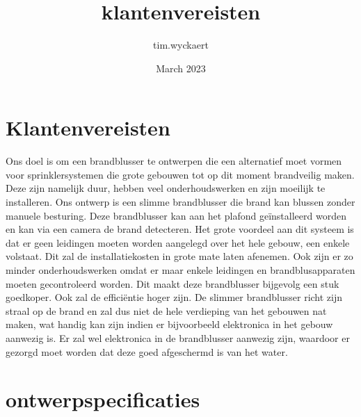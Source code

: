 \documentclass{article}
\title{klantenvereisten}
\author{tim.wyckaert }
\date{March 2023}
\begin{document}
\maketitle

\section{Klantenvereisten}

Ons doel is om een brandblusser te ontwerpen die een alternatief moet vormen voor sprinklersystemen die grote gebouwen tot op dit moment brandveilig maken. Deze zijn namelijk duur, hebben veel onderhoudswerken en zijn moeilijk te installeren. Ons ontwerp is een slimme brandblusser die brand kan blussen zonder manuele besturing. Deze brandblusser kan aan het plafond geïnstalleerd worden en kan via een camera  de brand  detecteren. Het grote voordeel aan dit systeem  is dat er geen leidingen moeten worden aangelegd over het hele gebouw, een enkele volstaat. Dit zal de installatiekosten in grote mate laten afenemen. Ook zijn er zo minder onderhoudswerken omdat er maar  enkele leidingen en brandblusapparaten moeten gecontroleerd worden. Dit maakt deze brandblusser bijgevolg een stuk goedkoper. Ook zal de efficiëntie hoger zijn. De slimmer brandblusser richt zijn straal op de brand en zal dus niet de hele verdieping van het gebouwen nat maken, wat handig kan zijn indien er  bijvoorbeeld elektronica in het gebouw aanwezig is. Er zal wel elektronica in de brandblusser aanwezig zijn, waardoor er gezorgd moet worden dat deze goed afgeschermd is van het water. 


\section{ontwerpspecificaties}
\end{document}
